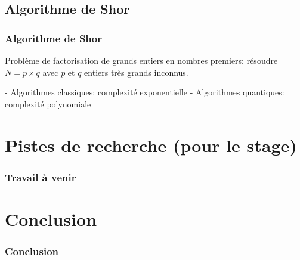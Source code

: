\documentclass{beamer}
\begin{document}
\subsection{Algorithme de Shor}

\begin{frame}
\frametitle{Algorithme de Shor \cite{Shor97}}

Problème de factorisation de grands entiers en nombres premiers: résoudre $N = p \times q$ avec $p$ et $q$ entiers très grands inconnus. 

\medbreak

- Algorithmes classiques: complexité exponentielle
\medbreak
- Algorithmes quantiques: complexité polynomiale




\end{frame}

\section{Pistes de recherche (pour le stage)}
\begin{frame}
  \frametitle{Travail à venir}

\end{frame}

\section{Conclusion}
\begin{frame}
\frametitle{Conclusion}
\end{frame}
\end{document}
